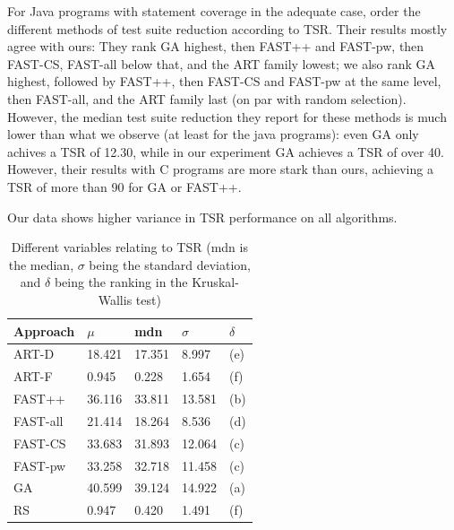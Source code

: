 For Java programs with statement coverage in the adequate case,
\cite{cruciani2019scalable} order the different methods of test suite
reduction according to TSR. Their results mostly agree with ours: They
rank GA highest, then FAST++ and FAST-pw, then FAST-CS, FAST-all below
that, and the ART family lowest; we also rank GA highest, followed by
FAST++, then FAST-CS and FAST-pw at the same level, then FAST-all, and
the ART family last (on par with random selection). However, the median
test suite reduction they report for these methods is much lower than what
we observe (at least for the java programs): even GA only achives a TSR
of 12.30, while in our experiment GA achieves a TSR of over 40. However,
their results with C programs are more stark than ours, achieving a TSR
of more than 90 for GA or FAST++.


Our data shows higher variance in TSR performance on all algorithms.

\begin{table}[htpb]
	\caption[TSR statistical results, adequate]{Different variables relating to TSR (mdn is the median, $\sigma$ being the standard deviation, and $\delta$ being the ranking in the Kruskal-Wallis test)}\label{tab:tsr_stats}
	\centering
	\begin{tabular}{| l | l | l | l | l |}
	\midrule
	Approach & $\mu$ & mdn & $\sigma$ & $\delta$ \\
	\midrule
	ART-D & 18.421 & 17.351 & 8.997 & (e) \\
	ART-F & 0.945 & 0.228 & 1.654 & (f) \\
	FAST++ & 36.116 & 33.811 & 13.581 & (b) \\
	FAST-all & 21.414 & 18.264 & 8.536 & (d) \\
	FAST-CS & 33.683 & 31.893 & 12.064 & (c) \\
	FAST-pw & 33.258 & 32.718 & 11.458 & (c) \\
	GA & 40.599 & 39.124 & 14.922 & (a) \\
	RS & 0.947 & 0.420 & 1.491 & (f) \\
	\bottomrule
	\end{tabular}
\end{table}

